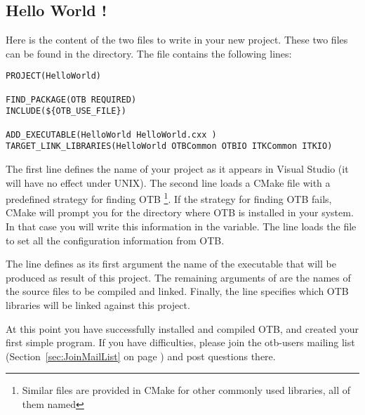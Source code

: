 \subsection{Hello World !}
\label{sec:HelloWorldOTB}


Here is the content of the two files to write in your new project. These two
files can be found in the  directory. The
 file contains the following lines:

\small
\begin{verbatim}
PROJECT(HelloWorld)

FIND_PACKAGE(OTB REQUIRED)
INCLUDE(${OTB_USE_FILE})

ADD_EXECUTABLE(HelloWorld HelloWorld.cxx )
TARGET_LINK_LIBRARIES(HelloWorld OTBCommon OTBIO ITKCommon ITKIO)
\end{verbatim}

\normalsize

The first line defines the name of your project as it appears in Visual
Studio (it will have no effect under UNIX). The second line loads a CMake
file with a predefined strategy for finding OTB \footnote{Similar files are
provided in CMake for other commonly used libraries, all of them named
}. If the strategy for finding OTB fails, CMake will prompt
you for the directory where OTB is installed in your system. In that case you
will write this information in the  variable. The line  loads the  file to set
all the configuration information from OTB.


The line 
defines as its first argument the name of the executable that will be produced
as result of this project. The remaining arguments of 
are the names of the source files to be compiled and linked.  Finally, the
 line specifies which OTB libraries will be
linked against this project.




At this point you have successfully installed and compiled OTB, and created
your first simple program. If you have difficulties, please join the
otb-users mailing list (Section~\ref{sec:JoinMailList} on page
\pageref{sec:JoinMailList}) and post questions there.
